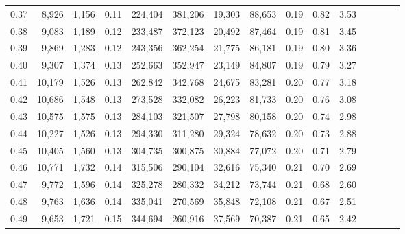 \begin{tabular}{rrrcrrrrrrrrrrr}
0.37 &   8,926 &  1,156 &                                       0.11 &  224,404 &  381,206 &   19,303 &   88,653 &  0.19 &  0.82 &                         3.53 \\
0.38 &   9,083 &  1,189 &                                       0.12 &  233,487 &  372,123 &   20,492 &   87,464 &  0.19 &  0.81 &                         3.45 \\
0.39 &   9,869 &  1,283 &                                       0.12 &  243,356 &  362,254 &   21,775 &   86,181 &  0.19 &  0.80 &                         3.36 \\
0.40 &   9,307 &  1,374 &                                       0.13 &  252,663 &  352,947 &   23,149 &   84,807 &  0.19 &  0.79 &                         3.27 \\
0.41 &  10,179 &  1,526 &                                       0.13 &  262,842 &  342,768 &   24,675 &   83,281 &  0.20 &  0.77 &                         3.18 \\
0.42 &  10,686 &  1,548 &                                       0.13 &  273,528 &  332,082 &   26,223 &   81,733 &  0.20 &  0.76 &                         3.08 \\
0.43 &  10,575 &  1,575 &                                       0.13 &  284,103 &  321,507 &   27,798 &   80,158 &  0.20 &  0.74 &                         2.98 \\
0.44 &  10,227 &  1,526 &                                       0.13 &  294,330 &  311,280 &   29,324 &   78,632 &  0.20 &  0.73 &                         2.88 \\
0.45 &  10,405 &  1,560 &                                       0.13 &  304,735 &  300,875 &   30,884 &   77,072 &  0.20 &  0.71 &                         2.79 \\
0.46 &  10,771 &  1,732 &                                       0.14 &  315,506 &  290,104 &   32,616 &   75,340 &  0.21 &  0.70 &                         2.69 \\
0.47 &   9,772 &  1,596 &                                       0.14 &  325,278 &  280,332 &   34,212 &   73,744 &  0.21 &  0.68 &                         2.60 \\
0.48 &   9,763 &  1,636 &                                       0.14 &  335,041 &  270,569 &   35,848 &   72,108 &  0.21 &  0.67 &                         2.51 \\
0.49 &   9,653 &  1,721 &                                       0.15 &  344,694 &  260,916 &   37,569 &   70,387 &  0.21 &  0.65 &                         2.42 \\

\end{tabular}
